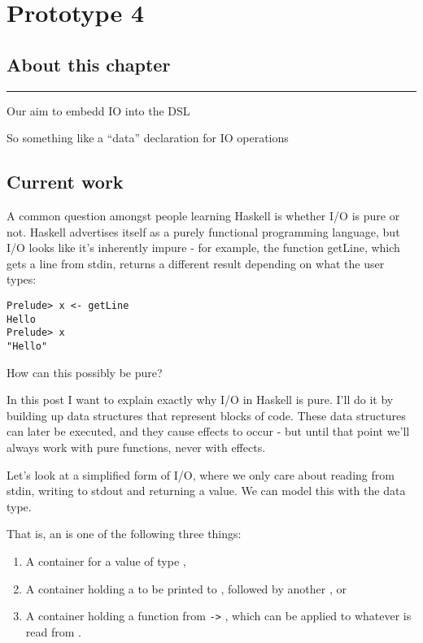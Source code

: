 \documentclass[thesis-solanki.tex]{subfiles}
\begin{document}
\chapter{Prototype 4}{\label{proto4}}


\section{About this chapter}

\noindent\rule{\textwidth}{0.5pt}

Our aim to embedd IO into the DSL

So something like a ``data'' declaration for IO operations

\section{Current work}

\cite{website:ioispurechristaylor}

A common question amongst people learning Haskell is whether I/O is pure or not. Haskell advertises itself as a purely functional 
programming language, but I/O looks like it's inherently impure - for example, the function getLine, which gets a line from stdin, returns 
a different result depending on what the user types:

\begin{verbatim}
Prelude> x <- getLine
Hello
Prelude> x
"Hello"
\end{verbatim}

How can this possibly be pure?

In this post I want to explain exactly why I/O in Haskell is pure. I'll do it by building up data structures that represent blocks of code. 
These data structures can later be executed, and they cause effects to occur - but until that point we'll always work with pure functions, 
never with effects.

Let's look at a simplified form of I/O, where we only care about reading from stdin, writing to stdout and returning a value. We can model 
this with the  data type.

That is, an  is one of the following three things:
\begin{enumerate}
\item A container for a value of type ,

\item A container holding a  to be printed to ,
  followed by another , or

\item A container holding a function from  \Verb!->! , which can be applied
  to whatever  is read from . 
\end{enumerate}
\end{document}
